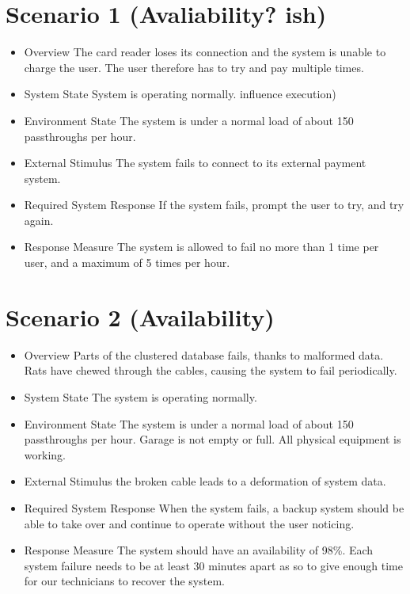 \section{Scenario 1 (Avaliability? ish)}
\begin{itemize}
	\item  Overview
	      \subitem  The card reader loses its connection and the system is unable to charge the user. The user therefore has to try and pay multiple times.
	\item  System State
	      \subitem  System is operating normally.
	      influence execution)
	\item  Environment State
	      \subitem  The system is under a normal load of about 150 passthroughs per hour.
	\item  External Stimulus
	      \subitem  The system fails to connect to its external payment system.
	\item  Required System Response
	      \subitem If the system fails, prompt the user to try, and try again.
	\item  Response Measure
	      \subitem The system is allowed to fail no more than 1 time per user, and a maximum of 5 times per hour.
\end{itemize}
\pagebreak


\section{Scenario 2 (Availability)}
\begin{itemize}
	\item  Overview
	      \subitem Parts of the clustered database fails, thanks to malformed data.
	      \subitem Rats have chewed through the cables, causing the system to fail periodically.
	\item  System State
	      \subitem The system is operating normally.
	\item  Environment State
	      \subitem The system is under a normal load of about 150 passthroughs per hour.
	      \subitem Garage is not empty or full. All physical equipment is working.
	\item  External Stimulus
	      \subitem the broken cable leads to a deformation of system data.
	\item  Required System Response
	      \subitem When the system fails, a backup system should be able to take over and continue to operate without the user noticing.
	\item  Response Measure
	      \subitem The system should have an availability of 98\%.
	      \subitem Each system failure needs to be at least 30 minutes apart as so to give enough time for our technicians to recover the system.
\end{itemize}

